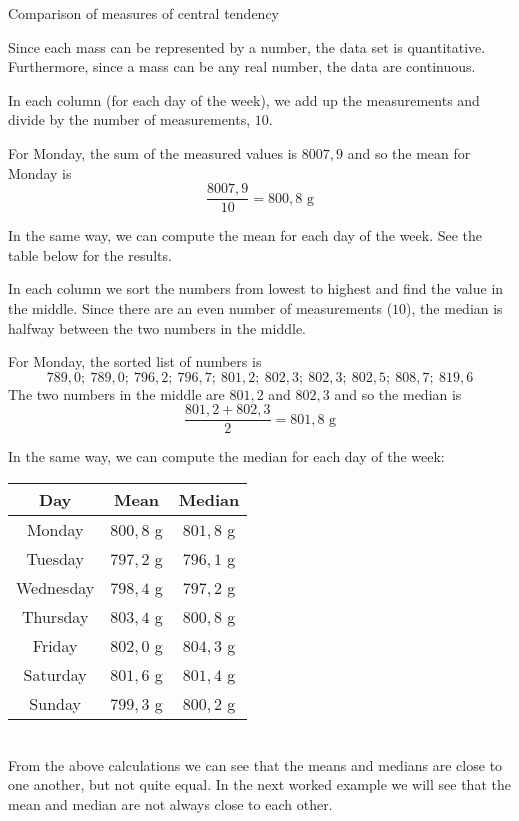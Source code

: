 \begin{wex}{Comparison of measures of central tendency}
{  Since each mass can be represented by a number, the data
  set is quantitative. Furthermore, since a mass can be any real
  number, the data are continuous.


  In each column (for each day of the week), we add up the
  measurements and divide by the number of measurements, $10$.

  For Monday, the sum of the measured values is $8007,9$ and so the
  mean for Monday is
  \begin{equation*}
    \frac{8007,9}{10} = 800,8\mbox{ g}
  \end{equation*}

  In the same way, we can compute the mean for each day of the
  week. See the table below for the results.


  In each column we sort the numbers from lowest to highest and find
  the value in the middle. Since there are an even number of
  measurements ($10$), the median is halfway between the two numbers in
  the middle.

  For Monday, the sorted list of numbers is
  \begin{equation*}
    789,0;\ 789,0;\ 796,2;\ 796,7;\ 801,2;\ 802,3;\ 802,3;\ 802,5;\ 808,7;\ 819,6
  \end{equation*}
  The two numbers in the middle are $801,2$ and $802,3$ and so the
  median is
  \begin{equation*}
    \frac{801,2 + 802,3}{2} = 801,8\mbox{ g}
  \end{equation*}

  In the same way, we can compute the median for each day of the
  week:
\\
  \begin{center}
    \begin{tabular}{|c|c|c|} \hline
      \textbf{Day} & \textbf{Mean} &\textbf{Median} \\  \hline
      Monday & $800,8$ g & $801,8$ g \\ \hline
      Tuesday & $797,2$ g & $796,1$ g \\ \hline
      Wednesday & $798,4$ g & $797,2$ g \\ \hline
      Thursday & $803,4$ g & $800,8$ g \\ \hline
      Friday & $802,0$ g & $804,3$ g \\ \hline
      Saturday & $801,6$ g & $801,4$ g \\ \hline
      Sunday & $799,3$ g & $800,2$ g \\ \hline
    \end{tabular}
  \end{center}
\vspace{8pt}\\
  From the above calculations we can see that the means and medians
  are close to one another, but not quite equal. In the next worked
  example we will see that the mean and median are not always
  close to each other.

}
\end{wex}

